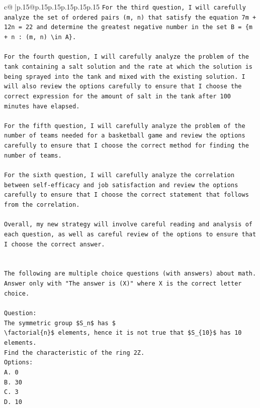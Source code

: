 \documentclass{article}
\begin{document}
{\begin{supertabular}{c@{$\;$}|p{.15\linewidth}@{}p{.15\linewidth}p{.15\linewidth}p{.15\linewidth}p{.15\linewidth}p{.15\linewidth}}
{{{\texttt{For the third question, I will carefully analyze the set of ordered pairs (m, n) that satisfy the equation 7m + 12n = 22 and determine the greatest negative number in the set B = \{m + n : (m, n) \textbackslash{}in A\}.} \\
\\ 
\texttt{For the fourth question, I will carefully analyze the problem of the tank containing a salt solution and the rate at which the solution is being sprayed into the tank and mixed with the existing solution. I will also review the options carefully to ensure that I choose the correct expression for the amount of salt in the tank after 100 minutes have elapsed.} \\
\\ 
\texttt{For the fifth question, I will carefully analyze the problem of the number of teams needed for a basketball game and review the options carefully to ensure that I choose the correct method for finding the number of teams.} \\
\\ 
\texttt{For the sixth question, I will carefully analyze the correlation between self{-}efficacy and job satisfaction and review the options carefully to ensure that I choose the correct statement that follows from the correlation.} \\
\\ 
\texttt{Overall, my new strategy will involve careful reading and analysis of each question, as well as careful review of the options to ensure that I choose the correct answer.} \\
\\ 
\\ 
\texttt{The following are multiple choice questions (with answers) about math. Answer only with "The answer is (X)" where X is the correct letter choice.} \\
\\ 
\texttt{Question:} \\
\texttt{The symmetric group \$S\_n\$ has \$} \\
\texttt{\textbackslash{}factorial\{n\}\$ elements, hence it is not true that \$S\_\{10\}\$ has 10 elements.} \\
\texttt{Find the characteristic of the ring 2Z.} \\
\texttt{Options:} \\
\texttt{A. 0} \\
\texttt{B. 30} \\
\texttt{C. 3} \\
\texttt{D. 10} \\
}}}
\end{supertabular}}
\end{document}
